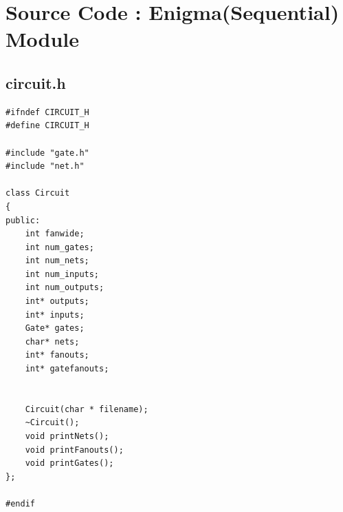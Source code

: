 \documentclass[a4paper,onesided,12pt]{report}
\begin{document}
\chapter{Source Code : Enigma(Sequential) Module}
\section{circuit.h}
\begin{verbatim}
#ifndef CIRCUIT_H
#define CIRCUIT_H

#include "gate.h"
#include "net.h"

class Circuit
{
public:
	int fanwide;
	int num_gates;
	int num_nets;
	int num_inputs;
	int num_outputs;
	int* outputs;
	int* inputs;
	Gate* gates;
	char* nets;
	int* fanouts;
	int* gatefanouts;


	Circuit(char * filename);
	~Circuit();
	void printNets();
	void printFanouts();
	void printGates();
};

#endif
\end{verbatim}
\end{document}
